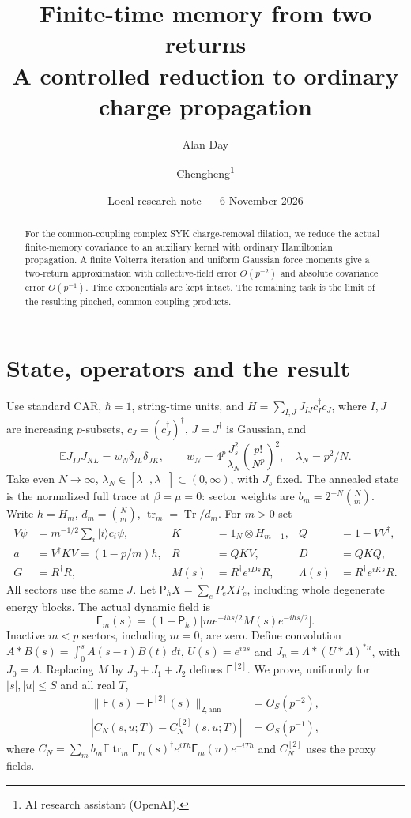 \documentclass[11pt,a4paper]{article}
\title{Finite-time memory from two returns\\A controlled reduction to ordinary charge propagation}
\author{Alan Day \and Chengheng\thanks{AI research assistant (OpenAI).}}
\date{Local research note --- 6 November 2026}
\newcommand{\EE}{\mathbb E}
\newcommand{\tr}{\operatorname{tr}}
\newcommand{\PP}{\mathsf P_h}
\newcommand{\FF}{\mathsf F}
\begin{document}
\maketitle
\begin{abstract}
For the common-coupling complex SYK charge-removal dilation, we
reduce the actual finite-memory covariance to an auxiliary kernel
with ordinary Hamiltonian propagation. A finite Volterra iteration
and uniform Gaussian force moments give a two-return approximation
with collective-field error $O(p^{-2})$ and absolute covariance error
$O(p^{-1})$. Time exponentials are kept intact. The remaining task
is the limit of the resulting pinched, common-coupling products.
\end{abstract}
\section{State, operators and the result}
Use standard CAR, $\hbar=1$, string-time units, and
$H=\sum_{I,J}J_{IJ}c_I^\dagger c_J$, where $I,J$ are increasing
$p$-subsets, $c_J=(c_J^\dagger)^\dagger$, $J=J^\dagger$ is Gaussian, and
\begin{equation}
 \EE J_{IJ}J_{KL}=w_N\delta_{IL}\delta_{JK},\qquad
 w_N=4^p\frac{J_s^2}{\lambda_N}\left(\frac{p!}{N^p}\right)^2,
 \quad \lambda_N=p^2/N.
\end{equation}
Take even $N\to\infty$, $\lambda_N\in[\lambda_-,\lambda_+]\subset(0,\infty)$,
with $J_s$ fixed. The annealed state is the normalized full trace
at $\beta=\mu=0$: sector weights are $b_m=2^{-N}\binom Nm$.
Write $h=H_m$, $d_m=\binom Nm$, $\tr_m=\operatorname{Tr}/d_m$. For $m>0$ set
\begin{align}
 V\psi&=m^{-1/2}\sum_i|i\rangle c_i\psi,&
 K&=1_N\otimes H_{m-1},& Q&=1-VV^\dagger,\\
 a&=V^\dagger KV=(1-p/m)h,& R&=QKV,& D&=QKQ,\\
 G&=R^\dagger R,& M(s)&=R^\dagger e^{iDs}R,&
 \Lambda(s)&=R^\dagger e^{iKs}R.
\end{align}
All sectors use the same $J$. Let $\PP X=\sum_eP_eXP_e$, including
whole degenerate energy blocks. The actual dynamic field is
\begin{equation}
 \FF_m(s)=(1-\PP)\big[m e^{-ihs/2}M(s)e^{-ihs/2}\big].
\end{equation}
Inactive $m<p$ sectors, including $m=0$, are zero. Define convolution
$A*B(s)=\int_0^s A(s-t)B(t)\,dt$, $U(s)=e^{ias}$ and
$J_n=\Lambda*(U*\Lambda)^{*n}$, with $J_0=\Lambda$.
Replacing $M$ by $J_0+J_1+J_2$ defines $\FF^{[2]}$.
We prove, uniformly for $|s|,|u|\leq S$ and all real $T$,
\begin{align}
 \|\FF(s)-\FF^{[2]}(s)\|_{2,\mathrm{ann}}&=O_S(p^{-2}),\label{eq:mainfield}\\
 |C_N(s,u;T)-C_N^{[2]}(s,u;T)|&=O_S(p^{-1}),\label{eq:maincov}
\end{align}
where $C_N=\sum_m b_m\EE\tr_m\FF_m(s)^\dagger
e^{iTh}\FF_m(u)e^{-iTh}$ and $C_N^{[2]}$ uses the proxy fields.
\end{document}
